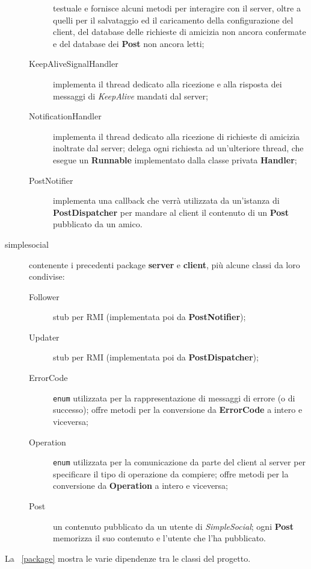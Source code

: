 \documentclass[11pt]{article}
\begin{document}
\begin{description}
\begin{description}
		testuale e fornisce alcuni metodi per interagire con il server, oltre a
		quelli per il salvataggio ed il caricamento della configurazione del
		client, del database delle richieste di amicizia non ancora confermate
		e del database dei {\bf Post} non ancora letti;
		\item[KeepAliveSignalHandler] implementa il thread dedicato alla
		ricezione e alla risposta dei messaggi di \emph{KeepAlive} mandati dal
		server;
		\item[NotificationHandler] implementa il thread dedicato alla ricezione
		di richieste di amicizia inoltrate dal server; delega ogni richiesta
		ad un'ulteriore thread, che esegue un {\bf Runnable} implementato dalla
		classe privata {\bf Handler};
		\item[PostNotifier] implementa una callback che verrà utilizzata da
		un'istanza di {\bf PostDispatcher} per mandare al client il contenuto
		di un {\bf Post} pubblicato da un amico.
	\end{description}
	\item[simplesocial] contenente i precedenti package {\bf server} e
	{\bf client}, più alcune classi da loro condivise:
	\begin{description}
		\item[Follower] stub per RMI (implementata poi da {\bf PostNotifier});
		\item[Updater] stub per RMI (implementata poi da {\bf PostDispatcher});
		\item[ErrorCode] {\tt enum} utilizzata per la rappresentazione di
		messaggi di errore (o di successo); offre metodi per la conversione da
		{\bf ErrorCode} a intero e viceversa;
		\item[Operation] {\tt enum} utilizzata per la comunicazione da parte del
		client al server per specificare il tipo di operazione da compiere;
		offre metodi per la conversione da {\bf Operation} a intero e viceversa;
		\item[Post] un contenuto pubblicato da un utente di \emph{SimpleSocial};
		ogni {\bf Post} memorizza il suo contenuto e l'utente che l'ha
		pubblicato.
	\end{description}
\end{description}

La \figurename~\ref{package} mostra le varie dipendenze tra le classi del
progetto.
\end{document}
